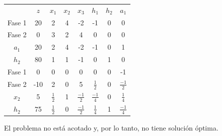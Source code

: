 \begin{enumerate}
\begin{center}
\begin{tabular}{c|c|cccccc|}
 & $z$ & $x_1$ & $x_2$ & $x_3$ & $h_1$ & $h_2$ & $a_1$\\ 
Fase 1 & 20 & 2 & 4 & -2 & -1 & 0 & 0 \\ 
Fase 2 & 0 & 3 & 2 & 4 & 0 & 0 & 0 \\ 
\hline
$a_1$ & 20  & 2 & 4 & -2 & -1 & 0 & 1\\ 
$h_2$ & 80  & 1 & 1 & -1 & 0 & 1 & 0\\ 
\hline
Fase 1 & 0 & 0 & 0 & 0 & 0 & 0 & -1 \\ 
Fase 2 & -10 & 2 & 0 & 5 & $\frac{1}{2}$ & 0 & $\frac{-1}{2}$ \\ 
\hline
$x_2$ & 5  & $\frac{1}{2}$ & 1 & $\frac{-1}{2}$ & $\frac{-1}{4}$ & 0 & $\frac{1}{4}$\\ 
$h_2$ & 75  & $\frac{1}{2}$ & 0 & $\frac{-1}{2}$ & $\frac{1}{4}$ & 1 & $\frac{-1}{4}$\\ 
\hline
\end{tabular}
\end{center}


El problema no está acotado y, por lo tanto, no tiene solución óptima. 

    
    \end{enumerate}





